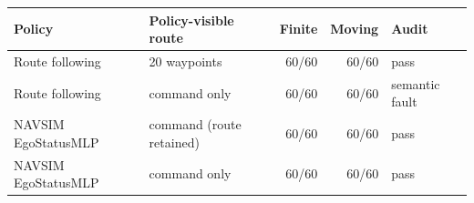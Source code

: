 \begin{tabular}{llrrl}
\toprule
Policy & Policy-visible route & Finite & Moving & Audit \\
\midrule
Route following & 20 waypoints & 60/60 & 60/60 & pass \\
Route following & command only & 60/60 & 60/60 & semantic fault \\
NAVSIM EgoStatusMLP & command (route retained) & 60/60 & 60/60 & pass \\
NAVSIM EgoStatusMLP & command only & 60/60 & 60/60 & pass \\
\bottomrule
\end{tabular}
